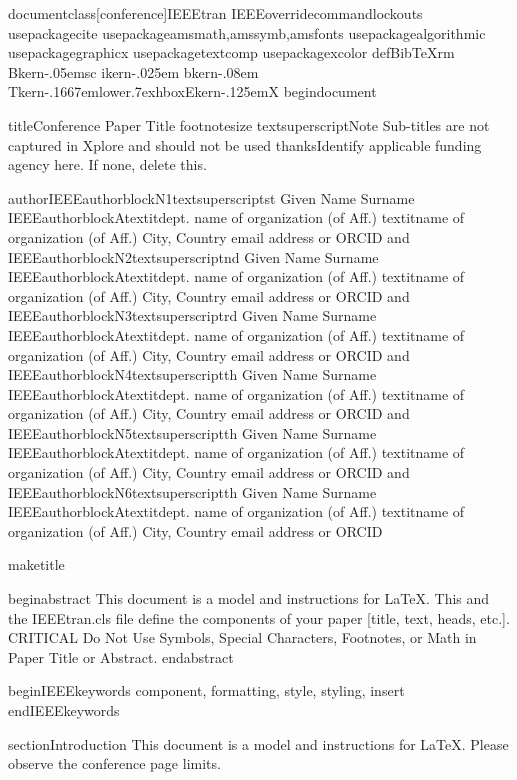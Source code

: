 documentclass[conference]{IEEEtran}
IEEEoverridecommandlockouts
usepackage{cite}
usepackage{amsmath,amssymb,amsfonts}
usepackage{algorithmic}
usepackage{graphicx}
usepackage{textcomp}
usepackage{xcolor}
defBibTeX{{rm Bkern-.05em{sc ikern-.025em b}kern-.08em
    Tkern-.1667emlower.7exhbox{E}kern-.125emX}}
begin{document}

title{Conference Paper Title
{footnotesize textsuperscript{}Note Sub-titles are not captured in Xplore and
should not be used}
thanks{Identify applicable funding agency here. If none, delete this.}
}

author{IEEEauthorblockN{1textsuperscript{st} Given Name Surname}
IEEEauthorblockA{textit{dept. name of organization (of Aff.)} 
textit{name of organization (of Aff.)}
City, Country 
email address or ORCID}
and
IEEEauthorblockN{2textsuperscript{nd} Given Name Surname}
IEEEauthorblockA{textit{dept. name of organization (of Aff.)} 
textit{name of organization (of Aff.)}
City, Country 
email address or ORCID}
and
IEEEauthorblockN{3textsuperscript{rd} Given Name Surname}
IEEEauthorblockA{textit{dept. name of organization (of Aff.)} 
textit{name of organization (of Aff.)}
City, Country 
email address or ORCID}
and
IEEEauthorblockN{4textsuperscript{th} Given Name Surname}
IEEEauthorblockA{textit{dept. name of organization (of Aff.)} 
textit{name of organization (of Aff.)}
City, Country 
email address or ORCID}
and
IEEEauthorblockN{5textsuperscript{th} Given Name Surname}
IEEEauthorblockA{textit{dept. name of organization (of Aff.)} 
textit{name of organization (of Aff.)}
City, Country 
email address or ORCID}
and
IEEEauthorblockN{6textsuperscript{th} Given Name Surname}
IEEEauthorblockA{textit{dept. name of organization (of Aff.)} 
textit{name of organization (of Aff.)}
City, Country 
email address or ORCID}
}

maketitle

begin{abstract}
This document is a model and instructions for LaTeX.
This and the IEEEtran.cls file define the components of your paper [title, text, heads, etc.]. CRITICAL Do Not Use Symbols, Special Characters, Footnotes, 
or Math in Paper Title or Abstract.
end{abstract}

begin{IEEEkeywords}
component, formatting, style, styling, insert
end{IEEEkeywords}

section{Introduction}
This document is a model and instructions for LaTeX.
Please observe the conference page limits. 

